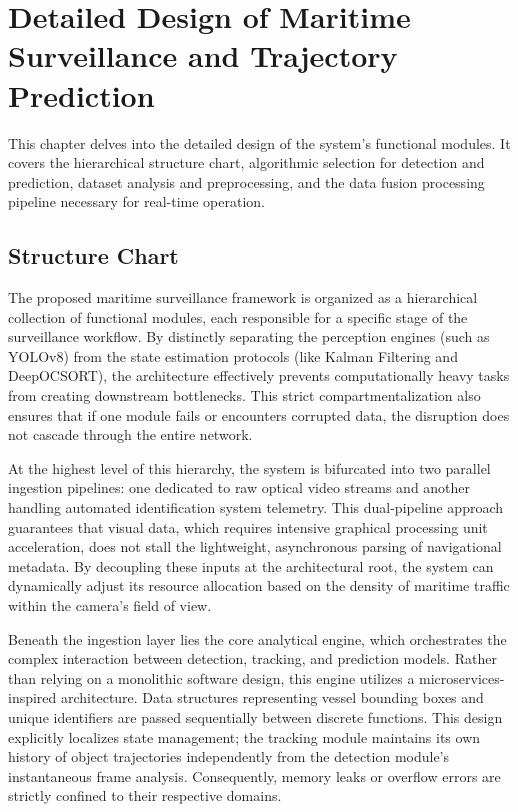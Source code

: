 \chapter{Detailed Design of Maritime Surveillance and Trajectory Prediction}

This chapter delves into the detailed design of the system's functional modules. It covers the hierarchical structure chart, algorithmic selection for detection and prediction, dataset analysis and preprocessing, and the data fusion processing pipeline necessary for real-time operation.

\section{Structure Chart}


The proposed maritime surveillance framework is organized as a hierarchical collection of functional modules, each responsible for a specific stage of the surveillance workflow. By distinctly separating the perception engines (such as YOLOv8) from the state estimation protocols (like Kalman Filtering and DeepOCSORT), the architecture effectively prevents computationally heavy tasks from creating downstream bottlenecks. This strict compartmentalization also ensures that if one module fails or encounters corrupted data, the disruption does not cascade through the entire network.

At the highest level of this hierarchy, the system is bifurcated into two parallel ingestion pipelines: one dedicated to raw optical video streams and another handling automated identification system telemetry. This dual-pipeline approach guarantees that visual data, which requires intensive graphical processing unit acceleration, does not stall the lightweight, asynchronous parsing of navigational metadata. By decoupling these inputs at the architectural root, the system can dynamically adjust its resource allocation based on the density of maritime traffic within the camera's field of view.

Beneath the ingestion layer lies the core analytical engine, which orchestrates the complex interaction between detection, tracking, and prediction models. Rather than relying on a monolithic software design, this engine utilizes a microservices-inspired architecture. Data structures representing vessel bounding boxes and unique identifiers are passed sequentially between discrete functions. This design explicitly localizes state management; the tracking module maintains its own history of object trajectories independently from the detection module's instantaneous frame analysis. Consequently, memory leaks or overflow errors are strictly confined to their respective domains.

